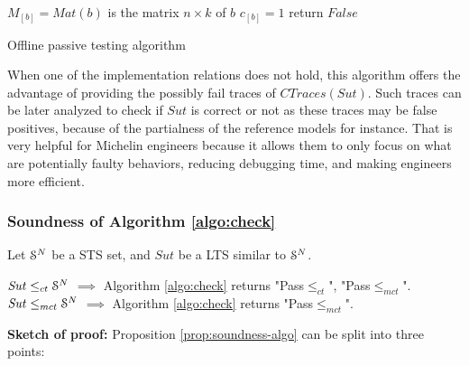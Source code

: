 \begin{algorithm}[h]
{{                $M_{[b]} = Mat(b)$ is the matrix $n \times k$ of $b$\;
                $c_{[b]} = 1$\;
        }
        return $False$\;
    }

    \caption{Offline passive testing algorithm}
    \label{algo:check}
\end{algorithm}

When one of the implementation relations does not hold, this
algorithm offers the advantage of providing the possibly fail
traces of $CTraces({Sut})$. Such traces can be later analyzed to
check if $\mathit{Sut}$ is correct or not as these traces may be
false positives, because of the partialness of the reference
models for instance. That is very helpful for Michelin engineers
because it allows them to only focus on what are potentially
faulty behaviors, reducing debugging time, and making engineers
more efficient.

\subsubsection{Soundness of Algorithm \ref{algo:check}}

\begin{proposition}
    Let $\EuScript{S}^{N}$ be a STS set, and $\mathit{Sut}$ be a
    LTS similar to $\EuScript{S}^{N}$.

    $\mathit{Sut} \leq_{ct} \EuScript{S}^N$ $\implies$
    Algorithm \ref{algo:check} returns "Pass$\leq_{ct}$",
    "Pass$\leq_{mct}$".\\
    $\mathit{Sut} \leq_{mct} \EuScript{S}^N$ $\implies$
    Algorithm \ref{algo:check} returns "Pass$\leq_{mct}$".

    \label{prop:soundness-algo}
\end{proposition}

\textbf{Sketch of proof:} Proposition \ref{prop:soundness-algo}
can be split into three points:


